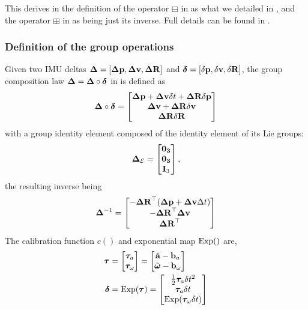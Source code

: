 This derives in the definition of the operator $\boxminus$ in  as what we detailed in , and the operator 
$\boxplus$ in  as being just its inverse.
Full details can be found in \cite[Section 3.4]{atchuthan-18-thesis}.


\subsubsection{Definition of the group operations}

Given two IMU deltas ${{\bm \Delta}}=[{\bm \Delta {\bf p}},{\bm \Delta {\bf v}},{\bm \Delta {\bf R}}]$ and ${\bm \delta}=[{\delta{\bf p}},{\delta{\bf v}},{\delta{\bf R}}]$, the group composition law ${{\bm \Delta}}={{\bm \Delta}}\circ\bm\delta$ in  is defined as
%
\begin{equation} 
    \label{eq:composition_delta}
    {{\bm \Delta}} \circ \bm\delta
    =
    \begin{bmatrix}
        {\bm \Delta {\bf p}} + {\bm \Delta {\bf v}}\delta t + {\bm \Delta {\bf R}}{\delta{\bf p}} \\
        {\bm \Delta {\bf v}} + {\bm \Delta {\bf R}}{\delta{\bf v}} \\
        {\bm \Delta {\bf R}}{\delta{\bf R}} 
    \end{bmatrix}
\end{equation}
%
with a group identity element composed of the identity element of its Lie groups:
%
\begin{equation}
    {{\bm \Delta}}_{\mathcal{E}} = \begin{bmatrix}
    \bf0_3\\ \bf0_3\\ {\bf I}_3
    \end{bmatrix},
\end{equation}
%
the resulting inverse being
%
\begin{equation}
\label{eq:inverse_delta}
    {{\bm \Delta}}^{-1} =     \begin{bmatrix}
    - {\bm \Delta {\bf R}}^{\top}({\bm \Delta {\bf p}} + {\bm \Delta {\bf v}} \Delta t) \\
    - {\bm \Delta {\bf R}}^{\top} {\bm \Delta {\bf v}} \\
      {\bm \Delta {\bf R}}^{\top}
    \end{bmatrix}
\end{equation}
%
The calibration function $c()$ and exponential map $\operatorname*{Exp}()$ are,
%
\begin{align}
    {\bm \tau} &= \begin{bmatrix}
    {\bm \tau}_a \\ {\bm \tau}_\omega
    \end{bmatrix} = \begin{bmatrix}
    \tilde{{\bf a}}-{\bf b}_a \\
    \tilde{{\bm \omega}}-{\bf b}_\omega
    \end{bmatrix}\\
    {\bm \delta} &= \operatorname*{Exp}({\bm \tau}) = \begin{bmatrix}
    \frac12{\bm \tau}_a\delta t^2 \\
    {\bm \tau}_a\delta t \\
    \operatorname*{Exp}({\bm \tau}_\omega\delta t)
    \end{bmatrix}
\end{align}
